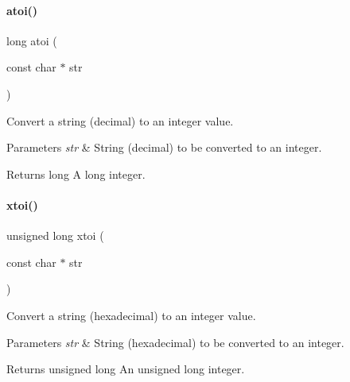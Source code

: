 \paragraph{\texorpdfstring{atoi()}{atoi()}}
{\footnotesize\ttfamily long atoi (\begin{DoxyParamCaption}\item[{const char $\ast$}]{str }\end{DoxyParamCaption})}



Convert a string (decimal) to an integer value. 


\begin{DoxyParams}{Parameters}
{\em str} & String (decimal) to be converted to an integer. \\
\hline
\end{DoxyParams}
\begin{DoxyReturn}{Returns}
long A long integer. 
\end{DoxyReturn}
\mbox{\label{a00113_a9d6165da864d16ad50c13690c1e7d7ea}} 
\paragraph{\texorpdfstring{xtoi()}{xtoi()}}
{\footnotesize\ttfamily unsigned long xtoi (\begin{DoxyParamCaption}\item[{const char $\ast$}]{str }\end{DoxyParamCaption})}



Convert a string (hexadecimal) to an integer value. 


\begin{DoxyParams}{Parameters}
{\em str} & String (hexadecimal) to be converted to an integer. \\
\hline
\end{DoxyParams}
\begin{DoxyReturn}{Returns}
unsigned long An unsigned long integer. 
\end{DoxyReturn}
